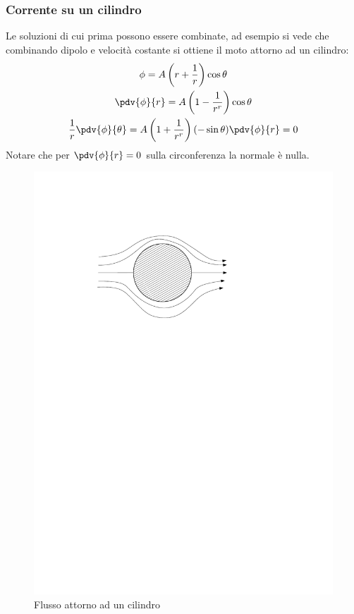 \subsubsection{Corrente su un cilindro}
Le soluzioni di cui prima possono essere combinate, ad esempio si vede che combinando dipolo e velocità costante si ottiene il moto attorno ad un cilindro:
%
	\begin{equation*}
		\begin{gathered}
			\phi = A \left( r + \frac{1}{r} \right) \cos{\theta}\\
			\pdv{\phi}{r} = A \left( 1 - \frac{1}{r^r} \right) \cos{\theta}\\
			\frac{1}{r} \pdv{\phi}{\theta} = A \left( 1 + \frac{1}{r^r} \right) (-\sin{\theta})
			\pdv{\phi}{r} = 0
		\end{gathered}
	\end{equation*}
%
Notare che per $\pdv{\phi}{r} = 0$ sulla circonferenza la normale è nulla.
%
	\begin{figure}[ht]
		\includegraphics[scale=0.7]{./7.3 Flusso irrotazionale/7.3-6}
		\centering
		\caption{Flusso attorno ad un cilindro}
	\end{figure}
